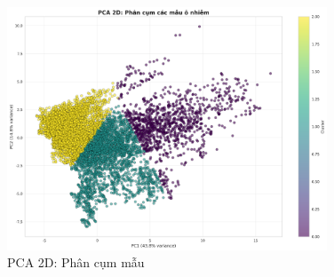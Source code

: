 \documentclass[12pt,a4paper]{article}
\begin{document}
\begin{figure}[H]
\centering
\includegraphics[width=0.85\textwidth]{results_comb_PM25_Hanoi_2018_sm_20251011_121424/20251011_121424_ml_pca_clusters.png}
\caption{PCA 2D: Phân cụm mẫu}
\end{figure}
\end{document}
